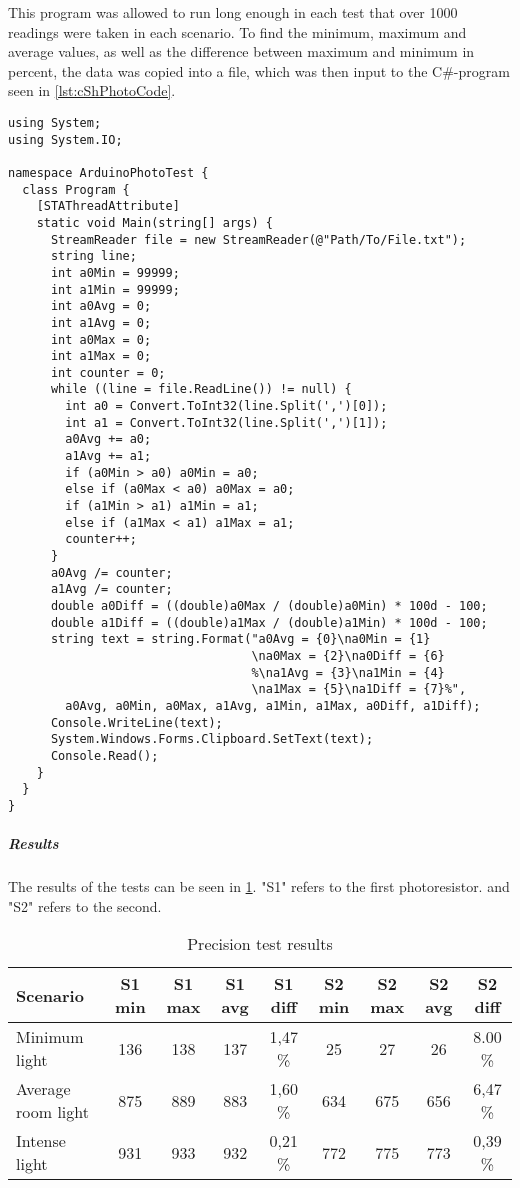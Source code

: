 This program was allowed to run long enough in each test that over 1000 readings were taken in each scenario.
To find the minimum, maximum and average values, as well as the difference between maximum and minimum in percent, the data was copied into a file, which was then input to the C\#-program seen in \cref{lst:cShPhotoCode}.

\lstset{language=[Sharp]C}
\begin{lstlisting}[label = lst:cShPhotoCode, caption = C\# data processing code, showstringspaces=false]
using System;
using System.IO;

namespace ArduinoPhotoTest {
  class Program {
    [STAThreadAttribute]
    static void Main(string[] args) {
      StreamReader file = new StreamReader(@"Path/To/File.txt");
      string line;
      int a0Min = 99999;
      int a1Min = 99999;
      int a0Avg = 0;
      int a1Avg = 0;
      int a0Max = 0;
      int a1Max = 0;
      int counter = 0;
      while ((line = file.ReadLine()) != null) {
        int a0 = Convert.ToInt32(line.Split(',')[0]);
        int a1 = Convert.ToInt32(line.Split(',')[1]);
        a0Avg += a0;
        a1Avg += a1;
        if (a0Min > a0) a0Min = a0;
        else if (a0Max < a0) a0Max = a0;
        if (a1Min > a1) a1Min = a1;
        else if (a1Max < a1) a1Max = a1;
        counter++;
      }
      a0Avg /= counter;
      a1Avg /= counter;
      double a0Diff = ((double)a0Max / (double)a0Min) * 100d - 100;
      double a1Diff = ((double)a1Max / (double)a1Min) * 100d - 100;
      string text = string.Format("a0Avg = {0}\na0Min = {1}
                                  \na0Max = {2}\na0Diff = {6}
                                  %\na1Avg = {3}\na1Min = {4}
                                  \na1Max = {5}\na1Diff = {7}%",
        a0Avg, a0Min, a0Max, a1Avg, a1Min, a1Max, a0Diff, a1Diff);
      Console.WriteLine(text);
      System.Windows.Forms.Clipboard.SetText(text);
      Console.Read();
    }
  }
}
\end{lstlisting}
\subparagraph{Results}
The results of the tests can be seen in \cref{tab:precisionTestResults}. "S1" refers to the first photoresistor. and "S2" refers to the second.

\begin{table}[H]
  \centering
  \begin{tabular}[htbp]{m{4.5em} c c c c c c c c}
    Scenario & S1 min & S1 max & S1 avg & S1 diff & S2 min & S2 max & S2 avg & S2 diff \\
    \hline
    Minimum light & 136 & 138 & 137 & 1,47 \% & 25 & 27 & 26 & 8.00 \% \\
    Average room light & 875 & 889 & 883 & 1,60 \%  & 634 & 675 & 656 & 6,47 \% \\
    Intense light & 931 & 933 & 932 & 0,21 \%  & 772 & 775 & 773 & 0,39 \% \\
  \end{tabular}
  \caption{Precision test results}\label{tab:precisionTestResults}
\end{table}

